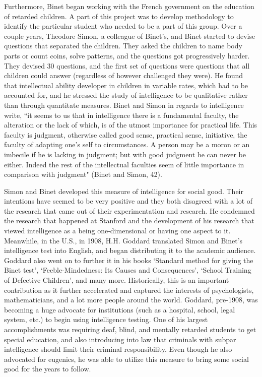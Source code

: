 \documentclass[12pt, oneside]{article}
\begin{document}
\par Furthermore, Binet began working with the French government on the education of retarded children. A part of this project was to develop methodology to identify the particular student who needed to be a part of this group. Over a couple years, Theodore Simon, a colleague of Binet's, and Binet started to devise questions that separated the children. They asked the children to name body parts or count coins, solve patterns, and the questions got progressively harder. They devised 30 questions, and the first set of questions were questions that all children could answer (regardless of however challenged they were). He found that intellectual ability developer in children in variable rates, which had to be accounted for, and he stressed the study of intelligence to be qualitative rather than through quantitate measures. Binet and Simon in regards to intelligence write, ``it seems to us that in intelligence there is a fundamental faculty, the alteration or the lack of which, is of the utmost importance for practical life. This faculty is judgment, otherwise called good sense, practical sense, initiative, the faculty of adapting one's self to circumstances. A person may be a moron or an imbecile if he is lacking in judgment; but with good judgment he can never be either. Indeed the rest of the intellectual faculties seem of little importance in comparison with judgment" (Binet and Simon, 42). 

\par Simon and Binet developed this measure of intelligence for social good. Their intentions have seemed to be very positive and they both disagreed with a lot of the research that came out of their experimentation and research. He condemned the research that happened at Stanford and the development of his research that viewed intelligence as a being one-dimensional or having one aspect to it. Meanwhile, in the U.S., in 1908, H.H. Goddard translated Simon and Binet's intelligence test into English, and began distributing it to the academic audience. Goddard also went on to further it in his books `Standard method for giving the Binet test', `Feeble-Mindedness: Its Causes and Consequences', `School Training of Defective Children', and many more. Historically, this is an important contribution as it further accelerated and captured the interests of psychologists, mathematicians, and a lot more people around the world. Goddard, pre-1908, was becoming a huge advocate for institutions (such as a hospital, school, legal system, etc.) to begin using intelligence testing. One of his largest accomplishments was requiring deaf, blind, and mentally retarded students to get special education, and also introducing into law that criminals with subpar intelligence should limit their criminal responsibility. Even though he also advocated for eugenics, he was able to utilize this measure to bring some social good for the years to follow.
\end{document}
